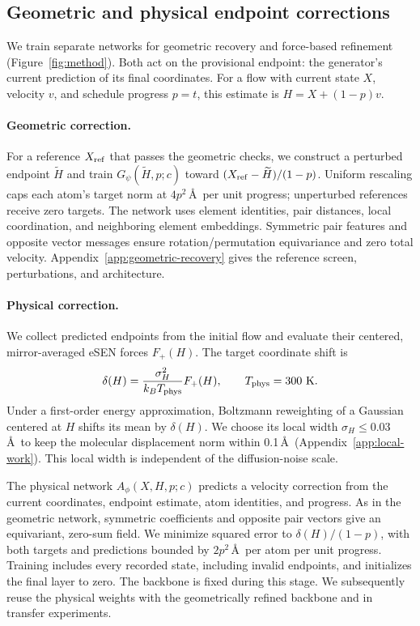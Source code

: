 \documentclass{article}
\begin{document}
\subsection{Geometric and physical endpoint corrections}\label{sec:endpoint-correction}
We train separate networks for geometric recovery and force-based refinement (Figure~\ref{fig:method}). Both act on the provisional endpoint: the generator's current prediction of its final coordinates. For a flow with current state $X$, velocity $v$, and schedule progress $p=t$, this estimate is $H=X+(1-p)v$.

\paragraph{Geometric correction.}
For a reference $X_{\rm ref}$ that passes the geometric checks, we construct a perturbed endpoint $\widetilde H$ and train $G_\psi(\widetilde H,p;c)$ toward $(X_{\rm ref}-\widetilde H)/(1-p)$. Uniform rescaling caps each atom's target norm at $4p^2$\,\AA\ per unit progress; unperturbed references receive zero targets. The network uses element identities, pair distances, local coordination, and neighboring element embeddings. Symmetric pair features and opposite vector messages ensure rotation/permutation equivariance and zero total velocity. Appendix~\ref{app:geometric-recovery} gives the reference screen, perturbations, and architecture.

\paragraph{Physical correction.}
We collect predicted endpoints from the initial flow and evaluate their centered, mirror-averaged eSEN forces $F_+(H)$. The target coordinate shift is
\begin{equation}
 \delta(H)=\frac{\sigma_H^2}{k_BT_{\rm phys}}F_+(H),
 \qquad T_{\rm phys}=300\ {\rm K}.
 \label{eq:local-force-shift}
\end{equation}
Under a first-order energy approximation, Boltzmann reweighting of a Gaussian centered at $H$ shifts its mean by $\delta(H)$. We choose its local width $\sigma_H\leq0.03$\,\AA\ to keep the molecular displacement norm within 0.1\,\AA\ (Appendix~\ref{app:local-work}). This local width is independent of the diffusion-noise scale.

The physical network $A_\phi(X,H,p;c)$ predicts a velocity correction from the current coordinates, endpoint estimate, atom identities, and progress. As in the geometric network, symmetric coefficients and opposite pair vectors give an equivariant, zero-sum field. We minimize squared error to $\delta(H)/(1-p)$, with both targets and predictions bounded by $2p^2$\,\AA\ per atom per unit progress. Training includes every recorded state, including invalid endpoints, and initializes the final layer to zero. The backbone is fixed during this stage. We subsequently reuse the physical weights with the geometrically refined backbone and in transfer experiments.
\end{document}
